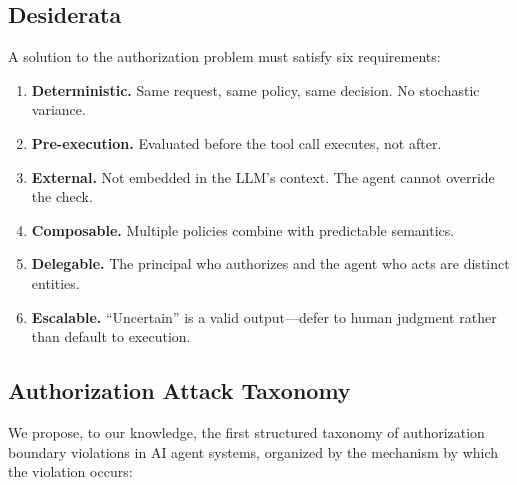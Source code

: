 \documentclass[11pt,a4paper]{article}
\begin{document}
\subsection{Desiderata}

A solution to the authorization problem must satisfy six requirements:
\begin{enumerate}[leftmargin=2em, itemsep=1pt]
  \item \textbf{Deterministic.} Same request, same policy, same decision. No stochastic variance.
  \item \textbf{Pre-execution.} Evaluated before the tool call executes, not after.
  \item \textbf{External.} Not embedded in the LLM's context. The agent cannot override the check.
  \item \textbf{Composable.} Multiple policies combine with predictable semantics.
  \item \textbf{Delegable.} The principal who authorizes and the agent who acts are distinct entities.
  \item \textbf{Escalable.} ``Uncertain'' is a valid output---defer to human judgment rather than default to execution.
\end{enumerate}

\subsection{Authorization Attack Taxonomy}

We propose, to our knowledge, the first structured taxonomy of authorization boundary violations in AI agent systems, organized by the mechanism by which the violation occurs:
\end{document}
